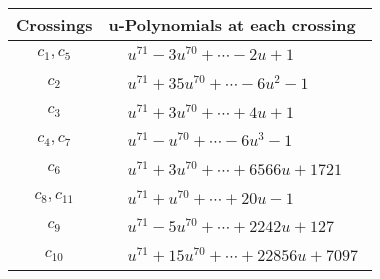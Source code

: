 \documentclass[1p]{elsarticle_modified}
\theoremstyle{definition}
\begin{document}
\begin{tabular}{m{50pt}|m{274pt}}
Crossings & \hspace{64pt}u-Polynomials at each crossing \\
\hline $$\begin{aligned}c_{1},c_{5}\end{aligned}$$&$\begin{aligned}
&u^{71}-3 u^{70}+\cdots-2 u+1
\end{aligned}$\\
\hline $$\begin{aligned}c_{2}\end{aligned}$$&$\begin{aligned}
&u^{71}+35 u^{70}+\cdots-6 u^2-1
\end{aligned}$\\
\hline $$\begin{aligned}c_{3}\end{aligned}$$&$\begin{aligned}
&u^{71}+3 u^{70}+\cdots+4 u+1
\end{aligned}$\\
\hline $$\begin{aligned}c_{4},c_{7}\end{aligned}$$&$\begin{aligned}
&u^{71}- u^{70}+\cdots-6 u^3-1
\end{aligned}$\\
\hline $$\begin{aligned}c_{6}\end{aligned}$$&$\begin{aligned}
&u^{71}+3 u^{70}+\cdots+6566 u+1721
\end{aligned}$\\
\hline $$\begin{aligned}c_{8},c_{11}\end{aligned}$$&$\begin{aligned}
&u^{71}+u^{70}+\cdots+20 u-1
\end{aligned}$\\
\hline $$\begin{aligned}c_{9}\end{aligned}$$&$\begin{aligned}
&u^{71}-5 u^{70}+\cdots+2242 u+127
\end{aligned}$\\
\hline $$\begin{aligned}c_{10}\end{aligned}$$&$\begin{aligned}
&u^{71}+15 u^{70}+\cdots+22856 u+7097
\end{aligned}$\\
\hline
\end{tabular}\newpage\renewcommand{\arraystretch}{1}
\end{document}
